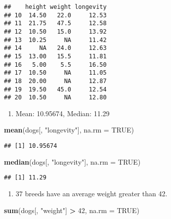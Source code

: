 \documentclass[
]{article}
\newenvironment{Shaded}{\begin{snugshade}}{\end{snugshade}}
\newcommand{\DataTypeTok}[1]{\textcolor[rgb]{0.13,0.29,0.53}{#1}}
\newcommand{\DecValTok}[1]{\textcolor[rgb]{0.00,0.00,0.81}{#1}}
\newcommand{\KeywordTok}[1]{\textcolor[rgb]{0.13,0.29,0.53}{\textbf{#1}}}
\newcommand{\NormalTok}[1]{#1}
\newcommand{\OperatorTok}[1]{\textcolor[rgb]{0.81,0.36,0.00}{\textbf{#1}}}
\newcommand{\OtherTok}[1]{\textcolor[rgb]{0.56,0.35,0.01}{#1}}
\newcommand{\StringTok}[1]{\textcolor[rgb]{0.31,0.60,0.02}{#1}}
\providecommand{\tightlist}{%
  \setlength{\itemsep}{0pt}\setlength{\parskip}{0pt}}
\begin{document}
\begin{verbatim}
##    height weight longevity
## 10  14.50   22.0     12.53
## 11  21.75   47.5     12.58
## 12  10.50   15.0     13.92
## 13  10.25     NA     11.42
## 14     NA   24.0     12.63
## 15  13.00   15.5     11.81
## 16   5.00    5.5     16.50
## 17  10.50     NA     11.05
## 18  20.00     NA     12.87
## 19  19.50   45.0     12.54
## 20  10.50     NA     12.80
\end{verbatim}

\begin{enumerate}
\def\labelenumi{\arabic{enumi}.}
\setcounter{enumi}{1}
\tightlist
\item
  Mean: 10.95674, Median: 11.29
\end{enumerate}

\begin{Shaded}
\begin{Highlighting}[]
\KeywordTok{mean}\NormalTok{(dogs[, }\StringTok{"longevity"}\NormalTok{], }\DataTypeTok{na.rm =} \OtherTok{TRUE}\NormalTok{)}
\end{Highlighting}
\end{Shaded}

\begin{verbatim}
## [1] 10.95674
\end{verbatim}

\begin{Shaded}
\begin{Highlighting}[]
\KeywordTok{median}\NormalTok{(dogs[, }\StringTok{"longevity"}\NormalTok{], }\DataTypeTok{na.rm =} \OtherTok{TRUE}\NormalTok{)}
\end{Highlighting}
\end{Shaded}

\begin{verbatim}
## [1] 11.29
\end{verbatim}

\begin{enumerate}
\def\labelenumi{\arabic{enumi}.}
\setcounter{enumi}{2}
\tightlist
\item
  37 breeds have an average weight greater than 42.
\end{enumerate}

\begin{Shaded}
\begin{Highlighting}[]
\KeywordTok{sum}\NormalTok{(dogs[, }\StringTok{"weight"}\NormalTok{] }\OperatorTok{\textgreater{}}\StringTok{ }\DecValTok{42}\NormalTok{, }\DataTypeTok{na.rm =} \OtherTok{TRUE}\NormalTok{)}
\end{Highlighting}
\end{Shaded}
\end{document}
